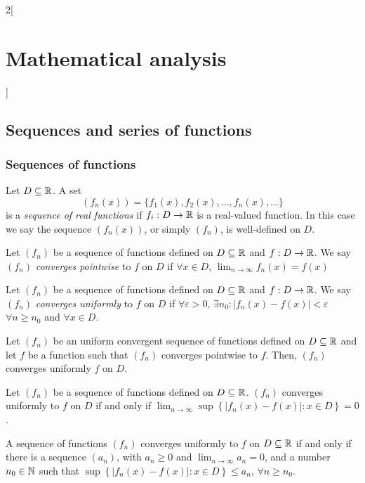 \documentclass[../../../main.tex]{subfiles}
\begin{document}
\begin{multicols}{2}[\section{Mathematical analysis}]
  \subsection{Sequences and series of functions}
  \subsubsection{Sequences of functions}
  \begin{definition}
    Let $D\subseteq\mathbb{R} $. A set $$(f_n(x))=\{f_1(x),f_2(x),\ldots,f_n(x),\ldots\}$$ is a \emph{sequence of real functions} if $f_i:D\rightarrow\mathbb{R} $ is a real-valued function. In this case we say the sequence $(f_n(x))$, or simply $(f_n)$, is well-defined on $D$.
  \end{definition}
  \begin{definition}
    Let $(f_n)$ be a sequence of functions defined on $D\subseteq\mathbb{R} $ and $f:D\rightarrow\mathbb{R} $. We say $(f_n)$ \emph{converges pointwise} to $f$ on $D$ if $\forall x\in D$, $\displaystyle\lim_{n\to\infty}f_n(x)=f(x)$
  \end{definition}
  \begin{definition}
    Let $(f_n)$ be a sequence of functions defined on $D\subseteq\mathbb{R} $ and $f:D\rightarrow\mathbb{R} $. We say $(f_n)$ \emph{converges uniformly} to $f$ on $D$ if $\forall\varepsilon>0$, $\exists n_0:|f_n(x)-f(x)|<\varepsilon$ $\forall n\geq n_0$ and $\forall x\in D$.
  \end{definition}
  \begin{lemma}
    Let $(f_n)$ be an uniform convergent sequence of functions defined on $D\subseteq\mathbb{R} $ and let $f$ be a function such that $(f_n)$ converges pointwise to $f$. Then, $(f_n)$ converges uniformly $f$ on $D$.
  \end{lemma}
  \begin{lemma}
    Let $(f_n)$ be a sequence of functions defined on $D\subseteq\mathbb{R} $. $(f_n)$ converges uniformly to $f$ on $D$ if and only if $\displaystyle \lim_{n\to\infty}\sup\left\{|f_n(x)-f(x)|:x\in D\right\}=0$.
  \end{lemma}
  \begin{corollary}
    A sequence of functions $(f_n)$ converges uniformly to $f$ on $D\subseteq\mathbb{R} $ if and only if there is a sequence $(a_n)$, with $a_n\geq 0$ and $\displaystyle \lim_{n\to\infty} a_n=0$, and a number $\displaystyle n_0\in\mathbb{N} $ such that $\sup\left\{|f_n(x)-f(x)|: x\in D\right\}\leq a_n$, $\forall n\geq n_0$.
  \end{corollary}
  \begin{theorem}

\end{theorem}
\end{multicols}
\end{document}
